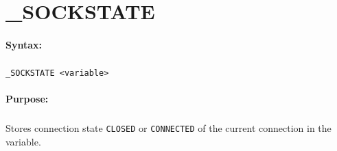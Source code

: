 
\newpage
\section{\_SOCKSTATE}
\label{cmd:_SOCKSTATE}

\paragraph{Syntax:}
\subparagraph{}
\texttt{\_SOCKSTATE <variable>}

\paragraph{Purpose:}
\subparagraph{}
Stores connection state \texttt{CLOSED} or \texttt{CONNECTED} 
of the current connection in the variable.